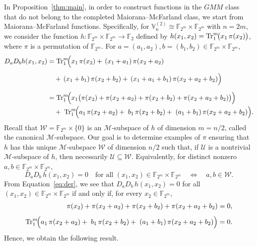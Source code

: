 \documentclass[12pt]{article}
\theoremstyle{plain}
\theoremstyle{definition}
\newcommand{\V}{\mathbb{V}}
\renewcommand{\to}{\rightarrow}
\newcommand{\Tr}{{\rm Tr}}
\begin{document}
	In Proposition~\ref{thm:main}, in order to construct functions in the \(GMM\) class that do not belong to the completed Maiorana--McFarland class, we start from Maiorana--McFarland functions.
	Specifically, for
	\(\V_n^{(2)} \cong \mathbb{F}_{2^m} \times \mathbb{F}_{2^m}\) with \(n = 2m\),
	we consider the function
	\(h : \mathbb{F}_{2^m} \times \mathbb{F}_{2^m} \to \mathbb{F}_2\) defined by $h(x_1,x_2) = \Tr_{1}^{m}\!\bigl(x_1\,\pi(x_2)\bigr)$,
	where \(\pi\) is a permutation of \(\mathbb{F}_{2^m}\).
	For $a=(a_{1},a_{2}), b=(b_{1},b_{2}) \in \mathbb{F}_{2^m}\times\mathbb{F}_{2^m}$, 
	\begin{align} \label{eq:der}
		D_{a}D_{b}h(x_1,x_2) 
		&= \Tr_{1}^{m}\!\Bigl(
		x_1\,\pi(x_2)
		+\,(x_1+a_{1})\,\pi(x_2+a_{2}) \nonumber \\[4pt]
		&\quad+\,(x_1+b_{1})\,\pi(x_2+b_{2})
		+\,(x_1+a_{1}+b_{1})\,\pi(x_2+a_{2}+b_{2})
		\Bigr) \nonumber \\[6pt]
		&= \Tr_{1}^{m}\!\Bigl(
		x_1\bigl(\pi(x_2)+\pi(x_2+a_{2})+\pi(x_2+b_{2})+\pi(x_2+a_{2}+b_{2})\bigr)
		\Bigr) \nonumber \\[-1pt]
		&\quad+\;\Tr_{1}^{m}\!\Bigl(
		a_{1}\,\pi(x_2+a_{2})
		+\;b_{1}\,\pi(x_2+b_{2})
		+\;(a_{1}+b_{1})\,\pi(x_2+a_{2}+b_{2})
		\Bigr).
	\end{align}
	Recall that $ \mathcal{W} =\mathbb{F}_{2^m} \times \{0\}$
	is an $\mathcal{M}$-subspace of $h$ of dimension $m=n/2$, called the canonical $\mathcal{M}$-subspace.  
	Our goal is to determine examples of $\pi$ ensuring that $h$ has this unique $\mathcal{M}$-subspace $\mathcal{W}$ of dimension $n/2$ such that, if $\mathcal{U}$ is a nontrivial $\mathcal{M}$-subspace of $h$, then necessarily $\mathcal{U} \subseteq \mathcal{W}$. Equivalently, for distinct nonzero $a, b \in \mathbb{F}_{2^m}\times\mathbb{F}_{2^m}$,
	\[
	D_{a}D_{b}\, h(x_1,x_2)=0 
	\quad\text{for all } (x_1,x_2)\in\mathbb{F}_{2^m}\times\mathbb{F}_{2^m}
	\quad\iff\quad 
	a,b\in \mathcal{W}.
	\]
	From Equation~\eqref{eq:der}, we see that $D_{a}D_{b}\, h(x_1,x_2)=0 $ for all $(x_1,x_2)\in\mathbb{F}_{2^m}\times\mathbb{F}_{2^m}$ if and only if, for every $x_2\in \mathbb{F}_{2^m}$,
	\begin{align*}
		\pi(x_2)+\pi(x_2+a_{2})+\pi(x_2+b_{2})+\pi(x_2+a_{2}+b_{2}) &= 0, \\[4pt] 
		\Tr_{1}^{m}\!\Bigl(
		a_{1}\,\pi(x_2+a_{2})
		+\;b_{1}\,\pi(x_2+b_{2})
		+\;(a_{1}+b_{1})\,\pi(x_2+a_{2}+b_{2})
		\Bigr) &= 0.
	\end{align*}
	Hence, we obtain the following result.
\end{document}
